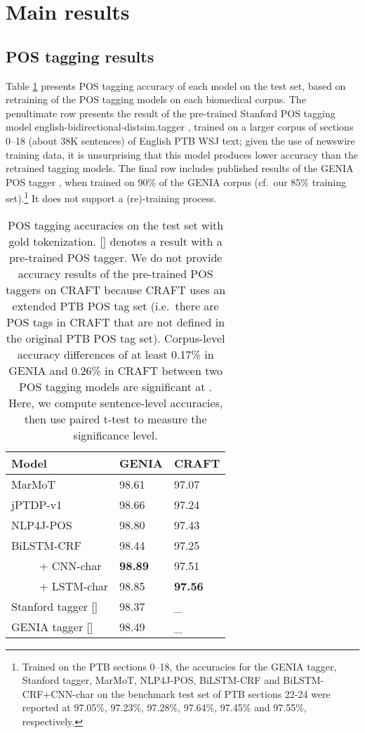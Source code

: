 \documentclass[twocolumn,hyperref]{bmcart}\pdfoutput=1
\newcommand{\CHANGEA}[1]{#1}
\begin{document}
\section*{Main results}

\subsection*{POS tagging results}
\label{ssec:pos}

Table \ref{tab:POSresults} presents POS tagging accuracy of each model on the test set, based on retraining of the POS tagging models on each biomedical corpus.  
The penultimate row  presents the result of the pre-trained Stanford POS tagging model \textsf{{english-bidirectional-distsim.tagger}} \cite{Toutanova:2003:FPT:1073445.1073478}, 
 trained  on a larger corpus of sections 0--18 (about 38K sentences) of English PTB WSJ text; 
given the use of newswire training data, \CHANGEA{it is unsurprising} that this model produces lower accuracy than the retrained  tagging  models.  
The final row includes published results of the 
GENIA POS tagger \cite{11573036_36}, when trained on  90\% of the GENIA corpus (cf.\ our 85\% training set).\footnote{Trained on the PTB sections 0--18, the accuracies for the GENIA tagger,   Stanford  tagger, MarMoT, NLP4J-POS, BiLSTM-CRF and  BiLSTM-CRF+CNN-char   on the benchmark test set of   PTB  sections 22-24  were reported at 97.05\%,  97.23\%, 97.28\%, 97.64\%, 97.45\% and 97.55\%, respectively.}    It does not support a (re)-training process.
 

 \begin{table}[!t]
 \caption{POS tagging accuracies on the test set  with gold tokenization. []  denotes a result with a pre-trained  POS tagger. \CHANGEA{We do not provide accuracy results of the pre-trained  POS taggers on CRAFT because CRAFT uses an extended PTB POS tag set (i.e.\ there are POS tags in CRAFT that are not defined in the original PTB POS tag set). Corpus-level accuracy differences of at least 0.17\% in GENIA and 0.26\% in CRAFT between two POS tagging models are significant at . Here, we  compute sentence-level accuracies, then use paired t-test to measure the significance level.}}
\centering
\def\arraystretch{1.05}
\begin{tabular}{l|l|l}
\hline
\textbf{Model} & \textbf{GENIA} & \textbf{CRAFT} \\
\hline 
MarMoT & 98.61 &	97.07 \\
 jPTDP-v1 &  98.66	& 97.24 \\
NLP4J-POS  & 98.80 & 97.43  \\
BiLSTM-CRF &  98.44	& 97.25   \\
 \ \ \ \ \ + CNN-char &  \textbf{98.89}	& 97.51  \\
 \ \ \ \ \ + LSTM-char & 98.85	 & \textbf{97.56}   \\
\hline
Stanford tagger [] & 98.37 & \_ \\
GENIA tagger [] & 98.49 & \_ \\
\hline
\end{tabular}
\label{tab:POSresults}
\end{table}
\end{document}
